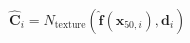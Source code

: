 $\mathbf{\hat{C}}_i=N_{\mathrm{texture}}\left( \mathbf{\hat{f}}(\mathbf{x}_{50,i}),\mathbf{d}_i \right)$